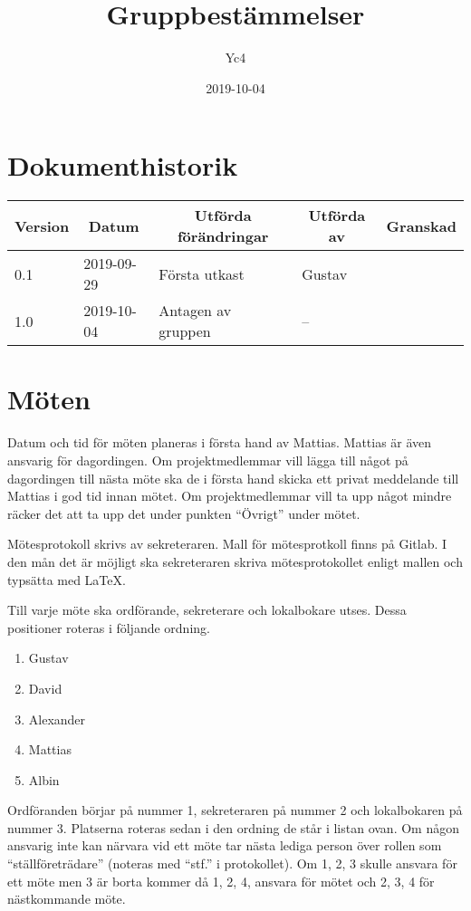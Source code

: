\documentclass[10pt,swedish,oneside]{lips-no_customer}
\title{Gruppbestämmelser}
\author{Yc4}
\date{2019-10-04}
\begin{document}
\maketitle

\cleardoublepage
\tableofcontents
\cleardoublepage

\section*{Dokumenthistorik}
    \begin{tabular}{p{}|p{}|p{}|p{}|p{}}
        \multicolumn{1}{c}{\bfseries Version} &
        \multicolumn{1}{|c}{\bfseries Datum} &
        \multicolumn{1}{|c}{\bfseries Utförda förändringar} &
        \multicolumn{1}{|c}{\bfseries Utförda av} &
        \multicolumn{1}{|c}{\bfseries Granskad}\\
        \hline
        \hline
        0.1 & 2019-09-29 & Första utkast & Gustav & \\\hline
	    	1.0 & 2019-10-04 & Antagen av gruppen & -- \\\hline        
    \end{tabular}

    \cleardoublepage
    \cfoot{\thepage}

    \section{Möten}
    Datum och tid för möten planeras i första hand av Mattias. Mattias är även ansvarig för dagordingen. Om projektmedlemmar vill lägga till något på dagordingen till nästa möte ska de i första hand skicka ett privat meddelande till Mattias i god tid innan mötet. Om projektmedlemmar vill ta upp något mindre räcker det att ta upp det under punkten ``Övrigt'' under mötet.

    Mötesprotokoll skrivs av sekreteraren. Mall för mötesprotkoll finns på Gitlab. I den mån det är möjligt ska sekreteraren skriva mötesprotokollet enligt mallen och typsätta med \LaTeX.

    Till varje möte ska ordförande, sekreterare och lokalbokare utses. Dessa positioner roteras i följande ordning.
    \begin{enumerate}
        \item Gustav
        \item David
        \item Alexander
        \item Mattias
        \item Albin
    \end{enumerate}
    Ordföranden börjar på nummer 1, sekreteraren på nummer 2 och lokalbokaren på nummer 3. Platserna roteras sedan i den ordning de står i listan ovan. Om någon ansvarig inte kan närvara vid ett möte tar nästa lediga person över rollen som ``ställföreträdare'' (noteras med ``stf.'' i protokollet). Om 1, 2, 3 skulle ansvara för ett möte men 3 är borta kommer då 1, 2, 4, ansvara för mötet och 2, 3, 4 för nästkommande möte.
\end{document}
